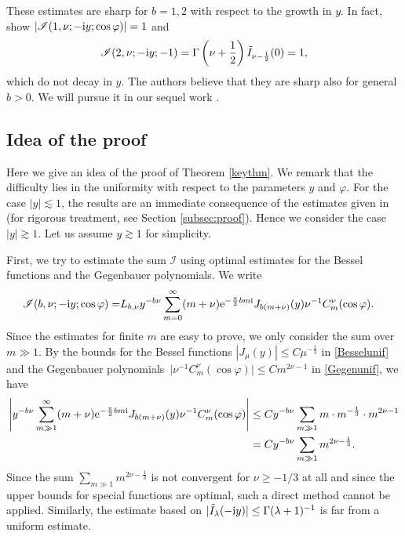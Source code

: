 \documentclass[pdftex]{sigma}
\numberwithin{equation}{section}
\def\f{\varphi}
\def\m{\mu}
\def\n{\nu}
\newcommand{\sI}{\mathscr{I}}
\begin{document}
\begin{Remark}\label{dispremark}
These estimates are sharp for $b=1,2$ with respect to the growth in $y$. In fact, \cite[equations~(4.45), (4,46)]{BKO} show $|\sI(1,\nu;-{\rm i}y;\cos\f)|=1$ and
\[
\sI(2,\nu;-{\rm i}y;-1)=\Gamma\left(\n+\frac{1}{2}\right)\tilde{I}_{\n-\frac{1}{2}}(0)=1,
\]
 which do not decay in $y$. The authors believe that they are sharp also for general $b>0$. We will pursue it in our sequel work \cite{TT}.
\end{Remark}

\subsection{Idea of the proof}

Here we give an idea of the proof of Theorem \ref{keythm}. We remark that the difficulty lies in the uniformity with respect to the parameters $y$ and $\f$. For the case $|y|\lesssim 1$, the results are an immediate consequence of the estimates given in \cite{BKO} (for rigorous treatment, see Section \ref{subsec:proof}). Hence we consider the case $|y|\gtrsim 1$. Let us assume $y\gtrsim 1$ for simplicity.

First, we try to estimate the sum $\sI$ using optimal estimates for the Bessel functions and the Gegenbauer polynomials. We write
\begin{align*}
\sI(b,\nu;- {\rm i}y;\cos\f)=&L_{b,\n}y^{-b\n}\sum_{m=0}^{\infty}(m+\nu){\rm e}^{-\frac{\pi}{2}bm {\rm i}}J_{b(m+\n)}(y)\n^{-1}C^{\nu}_m(\cos\f).
\end{align*}
Since the estimates for finite $m$ are easy to prove, we only consider the sum over $m\gg 1$.
By the bounds for the Bessel functions $|J_{\m}(y)|\leq C\m^{-\frac{1}{3}}$ in \eqref{Besselunif} and the Gegenbauer polynomials~${\big|\n^{-1}C_m^{\n}(\cos \f)\big|\leq Cm^{2\n-1}}$ in \eqref{Gegenunif}, we have
\begin{align*}
\left|y^{-b\n}\sum_{m\gg 1}^{\infty}(m+\nu){\rm e}^{-\frac{\pi}{2}bm {\rm i}}J_{b(m+\n)}(y)\n^{-1}C^{\nu}_m(\cos\f)\right|\leq{}& Cy^{-b\n}\sum_{m\gg 1}m\cdot m^{-\frac{1}{3}}\cdot m^{2\n-1}\\
={}&Cy^{-b\n}\sum_{m\gg 1}m^{2\n-\frac{1}{3}}.
\end{align*}
Since the sum $\sum_{m\gg 1}m^{2\n-\frac{1}{3}}$ is not convergent for $\n\ge -1/3$ at all and since the upper bounds for special functions are optimal, such a direct method cannot be applied. Similarly, the estimate based on %
$|\tilde{I}_{\lambda}(-{\rm i}y)|\le \Gamma(\lambda+1)^{-1}$
is far from a uniform estimate.
\end{document}
